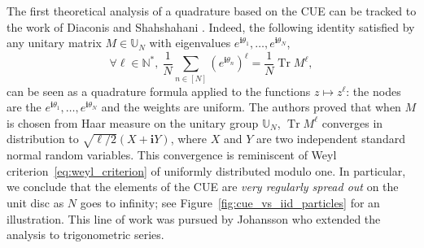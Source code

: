 \documentclass[twoside,11pt]{book}
\numberwithin{theorem}{chapter}
\numberwithin{definition}{chapter}
\numberwithin{proposition}{chapter}
\numberwithin{corollary}{chapter}
\numberwithin{example}{chapter}
\numberwithin{lemma}{chapter}
\numberwithin{assumption}{chapter}
\numberwithin{equation}{chapter}
\numberwithin{figure}{chapter}
\DeclareMathOperator{\Tr}{Tr}
\begin{document}





The first theoretical analysis of a  quadrature based on the CUE can be tracked to the work of Diaconis and Shahshahani \parencite{DiSh94}. Indeed, the following identity satisfied by any unitary matrix $M \in \mathbb{U}_{N}$ with eigenvalues $e^{\mathbf{i} \theta_{1}}, \dots, e^{\mathbf{i} \theta_{N}}$,
\begin{equation}
\forall \ell \in \mathbb{N}^{*}, \: \frac{1}{N} \sum\limits_{n \in [N]} (e^{\mathbf{i} \theta_{n}})^{\ell} = \frac{1}{N} \Tr M^{\ell},
\end{equation}
can be seen as a quadrature formula applied to the functions $z \mapsto z^{\ell}$: the nodes are the $e^{\mathbf{i} \theta_{1}}, \dots, e^{\mathbf{i} \theta_{N}}$ and the weights are uniform.
  The authors proved that when $M$ is chosen from Haar measure on the unitary group $\mathbb{U}_{N}$, $\Tr M^{\ell} $ converges in distribution to $\sqrt{\ell/2}(X+\mathbf{i} Y)$, where $X$ and $Y$ are two independent standard normal random variables. 
  This convergence is reminiscent of Weyl criterion~\eqref{eq:weyl_criterion} of uniformly distributed modulo one. In particular, we conclude that the elements of the CUE are \emph{very regularly spread out} on the unit disc as $N$ goes to infinity; see Figure~\ref{fig:cue_vs_iid_particles} for an illustration. This line of work was pursued by Johansson who extended the analysis to trigonometric series.
\end{document}
